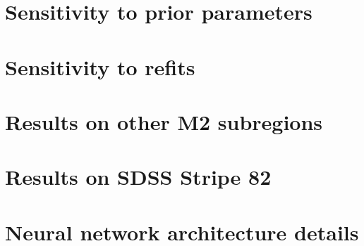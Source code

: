 \documentclass[twoside,11pt]{article}
\begin{document}
\section{Sensitivity to prior parameters}
\label{sec:prior_sensitivity}


\section{Sensitivity to refits}
\label{sec:refits}


\section{Results on other M2 subregions}
\label{sec:test_m2}



\section{Results on SDSS Stripe 82}
\label{sec:results_sparse_field}


\section{Neural network architecture details}
\label{sec:supp_nn_architecture}



\clearpage

\vskip 0.2in

\end{document}
